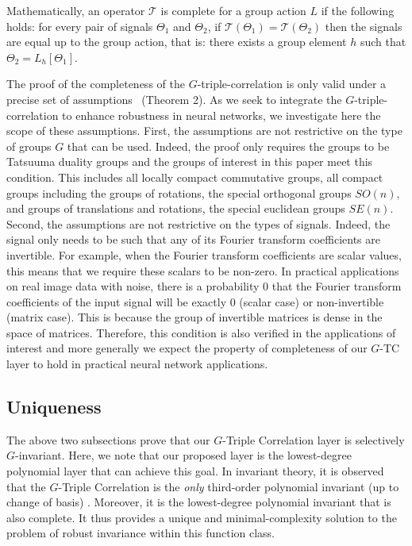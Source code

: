 Mathematically, an operator $\mathcal{T}$ is complete for a group action $L$ if the following holds: for every pair of signals $\Theta_1$ and $\Theta_2$, if $\mathcal{T}(\Theta_1) = \mathcal{T}(\Theta_2)$ then the signals are equal up to the group action, that is: there exists a group element $h$ such that $\Theta_2 = L_h[\Theta_1]$.

The proof of the completeness of the $G$-triple-correlation is only valid under a precise set of assumptions~\cite{kakarala1992triple} (Theorem 2). As we seek to integrate the $G$-triple-correlation to enhance robustness in neural networks, we investigate here the scope of these assumptions. First, the assumptions are not restrictive on the type of groups $G$ that can be used. Indeed, the proof only requires the groups to be Tatsuuma duality groups and the groups of interest in this paper meet this condition. This includes all locally compact commutative groups, all compact groups including the groups of rotations, the special orthogonal groups $SO(n)$, and groups of translations and rotations, the special euclidean groups $SE(n)$. Second, the assumptions are not restrictive on the types of signals. Indeed, the signal only needs to be such that any of its Fourier transform coefficients are invertible. For example, when the Fourier transform coefficients are scalar values, this means that we require these scalars to be non-zero. In practical applications on real image data with noise, there is a probability 0 that the Fourier transform coefficients of the input signal will be exactly 0 (scalar case) or non-invertible (matrix case). This is because the group of invertible matrices is dense in the space of matrices. Therefore, this condition is also verified in the applications of interest and more generally we expect the property of completeness of our $G$-TC layer to hold in practical neural network applications.

\subsection{Uniqueness}

The above two subsections prove that our $G$-Triple Correlation layer is selectively $G$-invariant. Here, we note that our proposed layer is the lowest-degree polynomial layer that can achieve this goal. In invariant theory, it is observed that the $G$-Triple Correlation is the \textit{only} third-order polynomial invariant (up to change of basis) \cite{sturmfels2008algorithms}. Moreover, it is the lowest-degree polynomial invariant that is also complete. It thus provides a unique and minimal-complexity solution to the problem of robust invariance within this function class.

